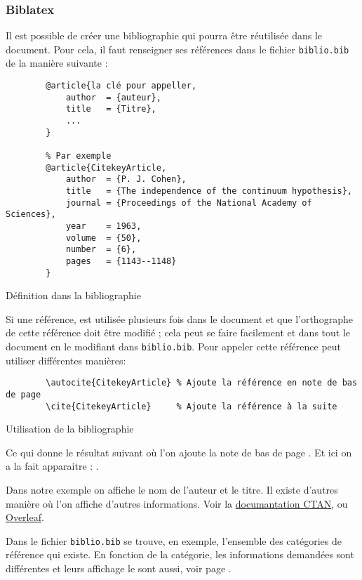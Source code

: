 \subsubsection{Biblatex}
Il est possible de créer une bibliographie qui pourra être réutilisée dans le document.
Pour cela, il faut renseigner ses références dans le fichier \verb=biblio.bib= de la manière suivante :
\begin{code}
    \begin{verbatim}
        @article{la clé pour appeller,
            author  = {auteur},
            title   = {Titre},
            ...
        }

        % Par exemple
        @article{CitekeyArticle,
            author  = {P. J. Cohen},
            title   = {The independence of the continuum hypothesis},
            journal = {Proceedings of the National Academy of Sciences},
            year    = 1963,
            volume  = {50},
            number  = {6},
            pages   = {1143--1148}
        }
\end{verbatim}
    \caption{Définition dans la bibliographie}
\end{code}

Si une référence, est utilisée plusieurs fois dans le document et que l’orthographe de cette référence
doit être modifié ; cela peut se faire facilement et dans tout le document en le modifiant dans
\verb=biblio.bib=.
Pour appeler cette référence peut utiliser différentes manières:
\begin{code}
    \begin{verbatim}
        \autocite{CitekeyArticle} % Ajoute la référence en note de bas de page
        \cite{CitekeyArticle}     % Ajoute la référence à la suite
\end{verbatim}
    \caption{Utilisation de la bibliographie}
\end{code}

Ce qui donne le résultat suivant où l'on ajoute la note de bas de page \autocite{CitekeyArticle}.
Et ici on a la fait apparaitre : \cite{CitekeyArticle}. \newline

Dans notre exemple on affiche le nom de l'auteur et le titre. Il existe d'autres manière où l'on affiche d'autres informations.
Voir la \href{https://mirror.ibcp.fr/pub/CTAN/macros/latex/contrib/biblatex/doc/biblatex.pdf#subsection.3.9}{documantation CTAN}, ou \href{https://fr.overleaf.com/learn/latex/Bibliography_management_with_bibtex}{Overleaf}. \newline

Dans le fichier \verb=biblio.bib= se trouve, en exemple, l'ensemble des catégories de référence qui existe.
En fonction de la catégorie, les informations demandées sont différentes et leurs affichage le sont aussi,
voir page \pageref{bibliographie}.